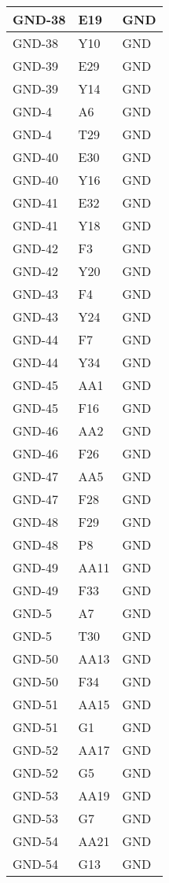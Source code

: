 \begin{footnotesize}
\begin{longtable}{|p{7cm}|p{1cm}|p{5cm}|}
GND-38	&	E19	&	GND	\\ \hline
GND-38	&	Y10	&	GND	\\ \hline
GND-39	&	E29	&	GND	\\ \hline
GND-39	&	Y14	&	GND	\\ \hline
GND-4	&	A6	&	GND	\\ \hline
GND-4	&	T29	&	GND	\\ \hline
GND-40	&	E30	&	GND	\\ \hline
GND-40	&	Y16	&	GND	\\ \hline
GND-41	&	E32	&	GND	\\ \hline
GND-41	&	Y18	&	GND	\\ \hline
GND-42	&	F3	&	GND	\\ \hline
GND-42	&	Y20	&	GND	\\ \hline
GND-43	&	F4	&	GND	\\ \hline
GND-43	&	Y24	&	GND	\\ \hline
GND-44	&	F7	&	GND	\\ \hline
GND-44	&	Y34	&	GND	\\ \hline
GND-45	&	AA1	&	GND	\\ \hline
GND-45	&	F16	&	GND	\\ \hline
GND-46	&	AA2	&	GND	\\ \hline
GND-46	&	F26	&	GND	\\ \hline
GND-47	&	AA5	&	GND	\\ \hline
GND-47	&	F28	&	GND	\\ \hline
GND-48	&	F29	&	GND	\\ \hline
GND-48	&	P8	&	GND	\\ \hline
GND-49	&	AA11	&	GND	\\ \hline
GND-49	&	F33	&	GND	\\ \hline
GND-5	&	A7	&	GND	\\ \hline
GND-5	&	T30	&	GND	\\ \hline
GND-50	&	AA13	&	GND	\\ \hline
GND-50	&	F34	&	GND	\\ \hline
GND-51	&	AA15	&	GND	\\ \hline
GND-51	&	G1	&	GND	\\ \hline
GND-52	&	AA17	&	GND	\\ \hline
GND-52	&	G5	&	GND	\\ \hline
GND-53	&	AA19	&	GND	\\ \hline
GND-53	&	G7	&	GND	\\ \hline
GND-54	&	AA21	&	GND	\\ \hline
GND-54	&	G13	&	GND	\\ \hline

\end{longtable}
\end{footnotesize}

